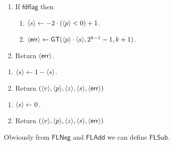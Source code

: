   \begin{enumerate}
    \item If $\mathsf{fdflag}$ then
          \begin{enumerate}
            \item $\langle s \rangle \leftarrow -2 \cdot (\langle p \rangle < 0) + 1$.
            \item $\langle \mathsf{err} \rangle \leftarrow \mathsf{GT}(\langle p \rangle \cdot \langle s \rangle,2^{k-1}-1,k+1)$.
          \end{enumerate}
    \item Return $\langle \mathsf{err} \rangle$.
  \end{enumerate}

\begin{enumerate}
  \item $\langle s \rangle \leftarrow 1-\langle s \rangle$.
  \item Return $(\langle v \rangle,\langle p \rangle,\langle z \rangle,\langle s \rangle,\langle \mathsf{err} \rangle)$
\end{enumerate}

  \begin{enumerate}
    \item $\langle s \rangle \leftarrow 0$.
    \item Return $(\langle v \rangle,\langle p \rangle,\langle z \rangle,\langle s \rangle,\langle \mathsf{err} \rangle)$
  \end{enumerate}
  Obviously from $\mathsf{FLNeg}$ and $\mathsf{FLAdd}$ we can define $\mathsf{FLSub}$.

